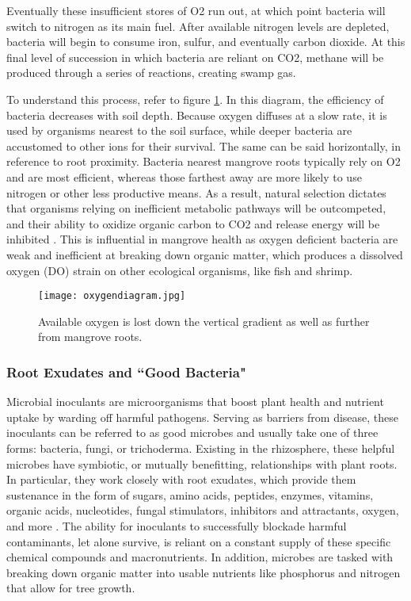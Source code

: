   Eventually these insufficient stores of O2 run out, at which point bacteria will switch to nitrogen as its main fuel. After available nitrogen levels are depleted, bacteria will begin to consume iron, sulfur, and eventually carbon dioxide. At this final level of succession in which bacteria are reliant on CO2, methane will be produced through a series of reactions, creating swamp gas. 
  
  To understand this process, refer to figure \ref{fig:oxygendiagram}. In this diagram, the efficiency of bacteria decreases with soil depth. Because oxygen diffuses at a slow rate, it is used by organisms nearest to the soil surface, while deeper bacteria are accustomed to other ions for their survival. The same can be said horizontally, in reference to root proximity. Bacteria nearest mangrove roots typically rely on O2 and are most efficient, whereas those farthest away are more likely to use nitrogen or other less productive means. As a result, natural selection dictates that organisms relying on inefficient metabolic pathways will be outcompeted, and their ability to oxidize organic carbon to CO2 and release energy will be inhibited \citep{dodds2002freshwater}. This is influential in mangrove health as oxygen deficient bacteria are weak and inefficient at breaking down organic matter, which produces a dissolved oxygen (DO) strain on other ecological organisms, like fish and shrimp. 
  
  
  \begin{figure}[!htb]
      \centering
        \texttt{[image: oxygendiagram.jpg]}
        \caption {Available oxygen is lost down the vertical gradient as well as further from mangrove roots.}
        \label{fig:oxygendiagram}
\end{figure}
  


\subsubsection{Root Exudates and ``Good Bacteria"}

  Microbial inoculants are microorganisms that boost plant health and nutrient uptake by warding off harmful pathogens. Serving as barriers from disease, these inoculants can be referred to as good microbes and usually take one of three forms: bacteria, fungi, or trichoderma. Existing in the rhizosphere, these helpful microbes have symbiotic, or mutually benefitting, relationships with plant roots. In particular, they work closely with root exudates, which provide them sustenance in the form of sugars, amino acids, peptides, enzymes, vitamins, organic acids, nucleotides, fungal stimulators, inhibitors and attractants, oxygen, and more \citep{shukla2011nature}. The ability for inoculants to successfully blockade harmful contaminants, let alone survive, is reliant on a constant supply of these specific chemical compounds and macronutrients. In addition, microbes are tasked with breaking down organic matter into usable nutrients like phosphorus and nitrogen that allow for tree growth. 
	
